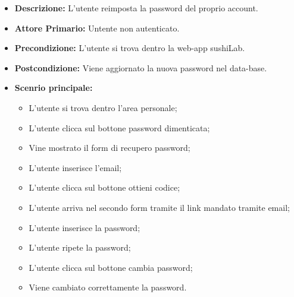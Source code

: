 \begin{itemize}
    \item \textbf{Descrizione:} L'utente reimposta la password del proprio account.
    \item \textbf{Attore Primario:} Untente non autenticato.
    \item \textbf{Precondizione:} L'utente si trova dentro la web-app sushiLab.
    \item \textbf{Postcondizione:} Viene aggiornato la nuova password nel data-base.
    \item \textbf{Scenrio principale:}
    \begin{itemize}
        \item L'utente si trova dentro l'area personale;
        \item L'utente clicca sul bottone password dimenticata;
        \item Vine mostrato il form di recupero password;
        \item L'utente inserisce l'email;
        \item L'utente clicca sul bottone ottieni codice;
        \item L'utente arriva nel secondo form tramite il link mandato tramite email;
        \item L'utente inserisce la password;
        \item L'utente ripete la password;
        \item L'utente clicca sul bottone cambia password;
        \item Viene cambiato correttamente la password.
    \end{itemize}
\end{itemize}
